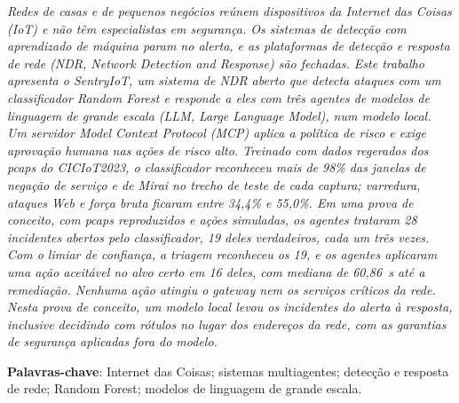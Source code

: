 \textit{Redes de casas e de pequenos negócios reúnem dispositivos da Internet das Coisas (IoT) e não têm especialistas em segurança. Os sistemas de detecção com aprendizado de máquina param no alerta, e as plataformas de detecção e resposta de rede (NDR, Network Detection and Response) são fechadas. Este trabalho apresenta o \mbox{SentryIoT}, um sistema de NDR aberto que detecta ataques com um classificador Random Forest e responde a eles com três agentes de modelos de linguagem de grande escala (LLM, Large Language Model), num modelo local. Um servidor Model Context Protocol (MCP) aplica a política de risco e exige aprovação humana nas ações de risco alto. Treinado com dados regerados dos pcaps do CICIoT2023, o classificador reconheceu mais de 98\% das janelas de negação de serviço e de Mirai no trecho de teste de cada captura; varredura, ataques Web e força bruta ficaram entre 34,4\% e 55,0\%. Em uma prova de conceito, com pcaps reproduzidos e ações simuladas, os agentes trataram 28 incidentes abertos pelo classificador, 19 deles verdadeiros, cada um três vezes. Com o limiar de confiança, a triagem reconheceu os 19, e os agentes aplicaram uma ação aceitável no alvo certo em 16 deles, com mediana de 60,86~s até a remediação. Nenhuma ação atingiu o gateway nem os serviços críticos da rede. Nesta prova de conceito, um modelo local levou os incidentes do alerta à resposta, inclusive decidindo com rótulos no lugar dos endereços da rede, com as garantias de segurança aplicadas fora do modelo.}

\vspace{\onelineskip}

\noindent
\textbf{Palavras-chave}: Internet das Coisas; sistemas multiagentes; detecção e resposta de rede; Random Forest; modelos de linguagem de grande escala.
